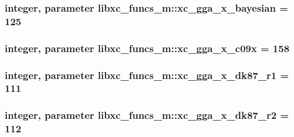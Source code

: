 \hypertarget{classlibxc__funcs__m_a5e7eeca943eb42a957300625335f885b}{
\subsubsection[{xc\-\_\-gga\-\_\-x\-\_\-bayesian}]{\setlength{\rightskip}{0pt plus 5cm}integer, parameter libxc\-\_\-funcs\-\_\-m\-::xc\-\_\-gga\-\_\-x\-\_\-bayesian = 125}}\label{classlibxc__funcs__m_a5e7eeca943eb42a957300625335f885b}
\hypertarget{classlibxc__funcs__m_a90045ccf4e4bc31c967fb33c660812f1}{
\subsubsection[{xc\-\_\-gga\-\_\-x\-\_\-c09x}]{\setlength{\rightskip}{0pt plus 5cm}integer, parameter libxc\-\_\-funcs\-\_\-m\-::xc\-\_\-gga\-\_\-x\-\_\-c09x = 158}}\label{classlibxc__funcs__m_a90045ccf4e4bc31c967fb33c660812f1}
\hypertarget{classlibxc__funcs__m_a387f7653badeed8326fa249baa785299}{
\subsubsection[{xc\-\_\-gga\-\_\-x\-\_\-dk87\-\_\-r1}]{\setlength{\rightskip}{0pt plus 5cm}integer, parameter libxc\-\_\-funcs\-\_\-m\-::xc\-\_\-gga\-\_\-x\-\_\-dk87\-\_\-r1 = 111}}\label{classlibxc__funcs__m_a387f7653badeed8326fa249baa785299}
\hypertarget{classlibxc__funcs__m_a08de938eedfdb373bd9c63259478c7ac}{
\subsubsection[{xc\-\_\-gga\-\_\-x\-\_\-dk87\-\_\-r2}]{\setlength{\rightskip}{0pt plus 5cm}integer, parameter libxc\-\_\-funcs\-\_\-m\-::xc\-\_\-gga\-\_\-x\-\_\-dk87\-\_\-r2 = 112}}\label{classlibxc__funcs__m_a08de938eedfdb373bd9c63259478c7ac}
